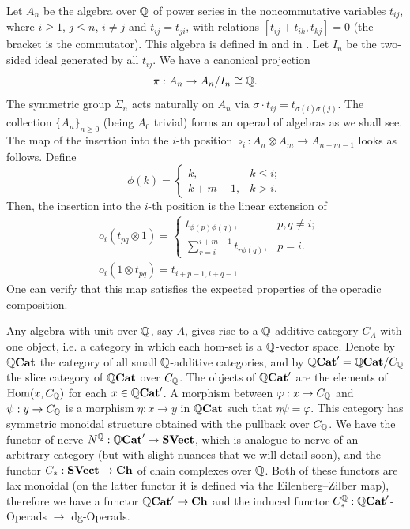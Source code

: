 \documentclass[TFM.tex]{subfiles}
\begin{document}
Let $A_n$ be the algebra over $\mathbb{Q}$ of power series in the noncommutative variables $t_{ij}$, where $i\geq 1$, $j\leq n$, $i\neq j$ and $t_{ij}=t_{ji}$, with relations $[t_{ij}+t_{ik},t_{kj}]=0$ (the bracket is the commutator). This algebra is defined in \cite{Tamarkin} and in \cite{1deTamarkin}. Let $I_n$ be the two-sided ideal generated by all $t_{ij}$. We have a canonical projection 
\begin{equation}\label{canonical}
\pi:A_n\to A_n/I_n\cong\mathbb{Q}.
\end{equation}
The symmetric group $\Sigma_n$ acts naturally on $A_n$ via $\sigma\cdot t_{ij}=t_{\sigma(i)\sigma(j)}$. The collection $\{A_n\}_{n\geq 0}$ (being $A_0$ trivial) forms an operad of algebras as we shall see. The map of the insertion into the $i$-th position $\circ_i: A_n\otimes A_m\to A_{n+m-1}$ looks as follows. Define
\[
\phi(k)=\begin{cases}
k, & k\leq i;\\
k+m-1, & k>i.
\end{cases}
\]
Then, the insertion into the $i$-th position is the linear extension of
\begin{align*}
&o_i(t_{pq}\otimes 1)=\begin{cases}
t_{\phi(p)\phi(q)}, &p,q\neq i;\\
\sum_{r=i}^{i+m-1}t_{r\phi(q)}, & p=i.
\end{cases} \\
& o_i(1\otimes t_{pq})=t_{i+p-1,i+q-1}
\end{align*}
One can verify that this map satisfies the expected properties of the operadic composition. %

Any algebra with unit over $\mathbb{Q}$, say $A$, gives rise to a $\mathbb{Q}$-additive category $C_A$ with one object, i.e. a category in which each hom-set is a $\mathbb{Q}$-vector space. Denote by $\mathbb{Q}\mathrm{\mathbf{Cat}}$ the category of all small $\mathbb{Q}$-additive categories, and by $\mathbb{Q}\mathrm{\mathbf{Cat}}'=\mathbb{Q}\mathrm{\mathbf{Cat}}/C_{\mathbb{Q}}$ the slice category of $\mathbb{Q}\mathrm{\mathbf{Cat}}$ over $C_{\mathbb{Q}}$. The objects of $\mathbb{Q}\mathrm{\mathbf{Cat}}'$ are the elements of $\operatorname{Hom}(x, C_{\mathbb{Q}})$ for each $x\in \mathbb{Q}\mathrm{\mathbf{Cat}}'$. A morphism between $\varphi:x\to C_{\mathbb{Q}}$ and $\psi:y\to C_{\mathbb{Q}}$ is a morphism $\eta: x\to y$ in $\mathbb{Q}\mathrm{\mathbf{Cat}}$ such that $\eta\psi=\varphi$.  This category has symmetric monoidal structure obtained with the pullback over $C_{\mathbb{Q}}$. We have the functor of nerve
$N^{\mathbb{Q}}: \mathbb{Q}\mathrm{\mathbf{Cat}}'\to \mathrm{\mathbf{SVect}}$, which is analogue to nerve of an arbitrary
category (but with slight nuances that we will detail soon), and the functor $C_*: \mathrm{\mathbf{SVect}} \to\mathrm{\mathbf{Ch}}$ of chain complexes over $\mathbb{Q}$. Both of these functors are lax monoidal (on the latter functor it is defined via the Eilenberg–Zilber map), therefore we have a functor $\mathbb{Q}\mathrm{\mathbf{Cat}}'\to\mathrm{\mathbf{Ch}}$ and the induced functor $C_*^{\mathbb{Q}}:\mathbb{Q}\mathrm{\mathbf{Cat}}'$-Operads $\to$ dg-Operads. 
\end{document}
